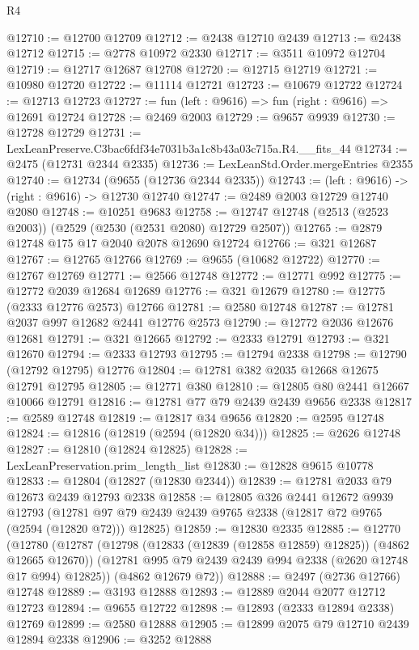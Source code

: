 \begin{lexlean}{R4}
\begin{coremodule}
@12710 := @12700 @12709
@12712 := @2438 @12710 @2439
@12713 := @2438 @12712
@12715 := @2778 @10972 @2330
@12717 := @3511 @10972 @12704
@12719 := @12717 @12687 @12708
@12720 := @12715 @12719
@12721 := @10980 @12720
@12722 := @11114 @12721
@12723 := @10679 @12722
@12724 := @12713 @12723
@12727 := fun (left : @9616) => fun (right : @9616) => @12691 @12724
@12728 := @2469 @2003
@12729 := @9657 @9939
@12730 := @12728 @12729
@12731 := LexLeanPreserve.C3bac6fdf34e7031b3a1c8b43a03c715a.R4.__fits_44
@12734 := @2475 (@12731 @2344 @2335)
@12736 := LexLeanStd.Order.mergeEntries @2355
@12740 := @12734 (@9655 (@12736 @2344 @2335))
@12743 := (left : @9616) -> (right : @9616) -> @12730 @12740
@12747 := @2489 @2003 @12729 @12740 @2080
@12748 := @10251 @9683
@12758 := @12747 @12748 (@2513 (@2523 @2003)) (@2529 (@2530 (@2531 @2080) @12729 @2507))
@12765 := @2879 @12748 @175 @17 @2040 @2078 @12690 @12724
@12766 := @321 @12687
@12767 := @12765 @12766
@12769 := @9655 (@10682 @12722)
@12770 := @12767 @12769
@12771 := @2566 @12748
@12772 := @12771 @992
@12775 := @12772 @2039 @12684 @12689
@12776 := @321 @12679
@12780 := @12775 (@2333 @12776 @2573) @12766
@12781 := @2580 @12748
@12787 := @12781 @2037 @997 @12682 @2441 @12776 @2573
@12790 := @12772 @2036 @12676 @12681
@12791 := @321 @12665
@12792 := @2333 @12791
@12793 := @321 @12670
@12794 := @2333 @12793
@12795 := @12794 @2338
@12798 := @12790 (@12792 @12795) @12776
@12804 := @12781 @382 @2035 @12668 @12675 @12791 @12795
@12805 := @12771 @380
@12810 := @12805 @80 @2441 @12667 @10066 @12791
@12816 := @12781 @77 @79 @2439 @2439 @9656 @2338
@12817 := @2589 @12748
@12819 := @12817 @34 @9656
@12820 := @2595 @12748
@12824 := @12816 (@12819 (@2594 (@12820 @34)))
@12825 := @2626 @12748
@12827 := @12810 (@12824 @12825)
@12828 := LexLeanPreservation.prim_length_list
@12830 := @12828 @9615 @10778
@12833 := @12804 (@12827 (@12830 @2344))
@12839 := @12781 @2033 @79 @12673 @2439 @12793 @2338
@12858 := @12805
    @326
    @2441
    @12672
    @9939
    @12793
    (@12781 @97 @79 @2439 @2439 @9765 @2338 (@12817 @72 @9765 (@2594 (@12820 @72))) @12825)
@12859 := @12830 @2335
@12885 := @12770
    (@12780
      (@12787
        (@12798 (@12833 (@12839 (@12858 @12859) @12825)) (@4862 @12665 @12670))
        (@12781 @995 @79 @2439 @2439 @994 @2338 (@2620 @12748 @17 @994) @12825))
      (@4862 @12679 @72))
@12888 := @2497 (@2736 @12766) @12748
@12889 := @3193 @12888
@12893 := @12889 @2044 @2077 @12712 @12723
@12894 := @9655 @12722
@12898 := @12893 (@2333 @12894 @2338) @12769
@12899 := @2580 @12888
@12905 := @12899 @2075 @79 @12710 @2439 @12894 @2338
@12906 := @3252 @12888

\end{coremodule}
\end{lexlean}
